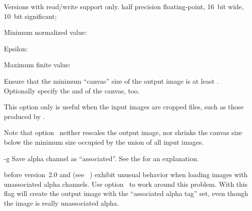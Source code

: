 \begin{codelist}
\begin{restrictedmaterial}{Versions with  read\slash write support only.}
     half precision floating-point, 16~bit wide,
    10~bit significant;

    \begin{compactitemize}
    \item
      Minimum normalized value: 
    \item
      Epsilon: 
    \item
      Maximum finite value: 
    \end{compactitemize}
  \end{restrictedmaterial}

  \label{opt:f}%
\item[-f \metavar{WIDTH}x\metavar{HEIGHT}%
  \optional{+x\metavar{XOFFSET}+y\metavar{YOFFSET}}]\itemend
  Ensure that the minimum ``canvas'' size of the output image is at least
  \classictimes{}.  Optionally specify the  and
   of the canvas, too.

  This option only is useful when the input images are cropped  files, such as
  those produced by .

  Note that option~ neither rescales the output image, nor shrinks the canvas size
  below the minimum size occupied by the union of all input images.


  \label{opt:g}%
\item[-g]
  Save alpha channel as ``associated''. See the
   for an explanation.

   before version~2.0 and  (see
  \appendixName~) exhibit unusual behavior when loading images
  with unassociated alpha channels.  Use option~ to work around this problem.  With
  this flag \App{} will create the output image with the ``associated alpha tag'' set, even
  though the image is really unassociated alpha.



\end{codelist}
